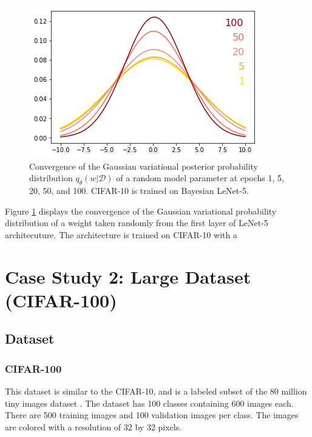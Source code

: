 \begin{figure}[H] 
\begin{center}
\includegraphics[width=\linewidth]{Chapter5/Figs/distribution.png}
\caption{Convergence of the Gaussian variational posterior probability distribution $q_{\theta}(w|\mathcal{D})$ of a random model parameter at epochs 1, 5, 20, 50, and 100. CIFAR-10 is trained on Bayesian LeNet-5.}
\label{fig:distribution}
\end{center}
\end{figure} 

\newline Figure \ref{fig:distribution} displays the convergence of the Gaussian variational probability distribution of a weight taken randomly from the first layer of LeNet-5 architecuture. The architecture is trained on CIFAR-10 with a 



\section{Case Study 2: Large Dataset (CIFAR-100)}
\subsection{Dataset}

\subsubsection{CIFAR-100}
This dataset is similar to the CIFAR-10, and is a labeled subset of the 80 million tiny images dataset \cite{Torralba:2008:MTI:1444381.1444403}. The dataset has 100 classes containing 600 images each. There are 500 training images and 100 validation images per class. The images are colored with a resolution of 32 by 32 pixels.

